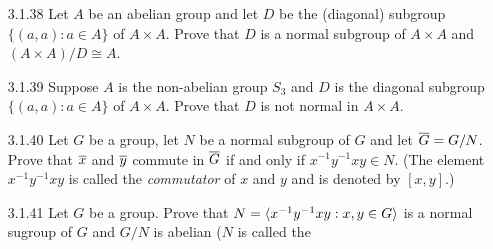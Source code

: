 \begin{enumerate}
      \textbf{Proof.} Define $S := \{(a, 1) : a \in A\}$. Let $g \in A \times B$
      and $s \in S$. It follows that $g = (a, b)$ and $s = (c, 1)$, where
      $a, c \in A$ and $b \in B$. Since $aca^{-1} \in A$ by closure, it follows
      that
      $$gsg^{-1} = (a, b)(c, 1)(a^{-1}, b^{-1}) = (ac, b)(a^{-1}, b^{-1}) =
        (aca^{-1}, 1) \in S.$$
      Conclude by Theorem 6(5) that $S \trianglelefteq A \times B$. Consider the
      map $\varphi : B \rightarrow (A \times B) / S$, $b \mapsto \m{(1, b)}$.
      This map is a homomorphism because, for $x, y \in B$, we have that
      $$\varphi(xy) = \m{(1, xy)} = \m{(1, x)}\cdot\m{(1, y)} =
        \varphi(x)\varphi(y).$$
      Since the kernel of $\varphi = \{1\}$, it follows by Exercise 1.6.14 that
      $\varphi$ is injective. Now if $\m{(a, b)} \in (A \times B) / S$, then
      $\varphi(b) = \m{(1, b)} = \m{(a, b)}$; the last equality followed because
      $(a^{-1}, b^{-1})(1, b) = (a^{-1}, 1) \in S$ (Proposition 4). Thus
      $\varphi$ is surjective. Conclude that $\varphi$ is an isomorphism; that
      is, $(A \times B) / S \cong B$. \qed
   \item[3.1.38]  Let $A$ be an abelian group and let $D$ be the (diagonal)
                  subgroup $\{(a, a) : a \in A\}$ of $A \times A$. Prove that
                  $D$ is a normal subgroup of $A \times A$ and
                  $(A \times A)/D \cong A$.
   \item[3.1.39]  Suppose $A$ is the non-abelian group $S_3$ and $D$ is the
                  diagonal subgroup $\{(a, a) : a \in A\}$ of $A \times A$.
                  Prove that $D$ is not normal in $A \times A$.
   \item[3.1.40]  Let $G$ be a group, let $N$ be a normal subgroup of $G$ and
                  let $\overline{G} = G/N$. Prove that $\overline{x}$ and $\overline{y}$ commute in
                  $\overline{G}$ if and only if $x^{-1}y^{-1}xy \in N$. (The element
                  $x^{-1}y^{-1}xy$ is called the \textit{commutator} of $x$ and
                  $y$ and is denoted by $[x, y]$.)
   \item[3.1.41]  Let $G$ be a group. Prove that
                  $N = \langle x^{-1}y^{-1}xy : x, y \in G \rangle$ is a normal sugroup of
                  $G$ and $G/N$ is abelian ($N$ is called the

\end{enumerate}
